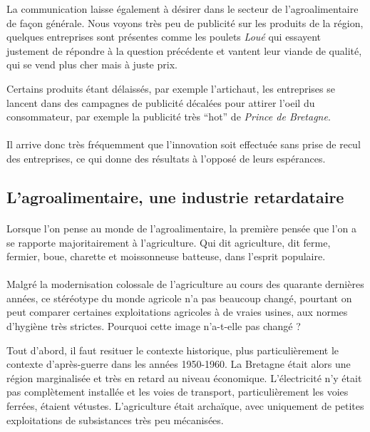 \documentclass[a4paper,12pt]{report}
\begin{document}
			La communication laisse également à désirer dans le secteur de l’agroalimentaire de façon générale. Nous voyons très peu de publicité sur les produits de la région, quelques entreprises sont présentes comme les poulets \textit{Loué} qui essayent justement de répondre à la question précédente et vantent leur viande de qualité, qui se vend plus cher mais à juste prix.

			Certains produits étant délaissés, par exemple l’artichaut, les entreprises se lancent dans des campagnes de publicité décalées pour attirer l’oeil du consommateur, par exemple la publicité très “hot” de \textit{Prince de Bretagne}.
			
			\paragraph{}Il arrive donc très fréquemment que l'innovation soit effectuée sans prise de recul des entreprises, ce qui donne des résultats à l'opposé de leurs espérances.
			
		\subsection{L'agroalimentaire, une industrie retardataire}
			\paragraph{}Lorsque l’on pense au monde de l’agroalimentaire, la première pensée que l’on a se rapporte majoritairement à l’agriculture. Qui dit agriculture, dit ferme, fermier, boue, charette et moissonneuse batteuse, dans l’esprit populaire.
			
			\paragraph{}Malgré la modernisation colossale de l’agriculture au cours des quarante dernières années, ce stéréotype du monde agricole n’a pas beaucoup changé, pourtant on peut comparer certaines exploitations agricoles à de vraies usines, aux normes d’hygiène très strictes. Pourquoi cette image n’a-t-elle pas changé ?
			
			Tout d’abord, il faut resituer le contexte historique, plus particulièrement le contexte d’après-guerre dans les années 1950-1960. La Bretagne était alors une région marginalisée et très en retard au niveau économique. L’électricité n’y était pas complètement installée et les voies de transport, particulièrement les voies ferrées, étaient vétustes. L’agriculture était archaïque, avec uniquement de petites exploitations de subsistances très peu mécanisées.
		
\end{document}
